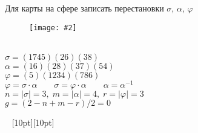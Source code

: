 \documentclass[a4paper,12pt]{article}
\numberwithin{figure}{section}
\newcommand\CenterFigure[2]{\begin{figure}[H]\centering\texttt{[image: \#2]}\end{figure}}
\begin{document}
\begin{problem}
	Для карты на сфере записать перестановки $\sigma$, $\alpha$, $\varphi$
		\CenterFigure{6cm}{permutations-on-sphere.png}
\end{problem}
\begin{solution}
	\ \\
	$\sigma = (1 7 4 5) (2 6) (3 8)$ \\
	$\alpha = (1 6) (2 8) (3 7) (5 4)$ \\
	$\varphi = (5) (1 2 3 4) (7 8 6)$ \\
	$\varphi = \sigma \cdot \alpha \qquad \sigma = \varphi \cdot \alpha \qquad \alpha = \alpha^{-1}$ \\
	$n=|\sigma|=3 ,\; m=|\alpha|=4 ,\; r=|\varphi|=3$ \\
	$g = (2-n+m-r)/2 = 0$  
\end{solution}



\vspace{48pt} \noindent \hrulefill~ \raisebox{-8pt}[10pt][10pt]{\Huge{}}~ \hrulefill
\end{document}
